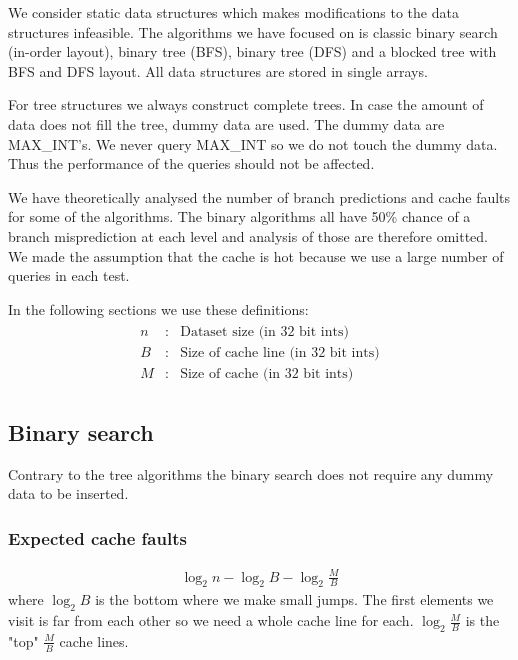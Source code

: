 We consider static data structures which makes modifications to the data structures infeasible.
The algorithms we have focused on is classic binary search (in-order layout), binary tree (BFS), binary tree (DFS) and a blocked tree with BFS and DFS layout. All data structures are stored in single arrays.

For tree structures we always construct complete trees. In case the amount of data does not fill the tree, dummy data are used. The dummy data are MAX\_INT's. We never query MAX\_INT so we do not touch the dummy data. Thus the performance of the queries should not be affected.

We have theoretically analysed the number of branch predictions and cache faults for some of the algorithms. The binary algorithms all have 50\% chance of a branch misprediction at each level and analysis of those are therefore omitted. We made the assumption that the cache is hot because we use a large number of queries in each test.

In the following sections we use these definitions:
\begin{eqnarray*}
\begin{array}{rcl}
n & : & \textrm{Dataset size (in 32 bit ints)} \\
B & : & \textrm{Size of cache line (in 32 bit ints)} \\
M & : & \textrm{Size of cache (in 32 bit ints)}
\end{array}
\end{eqnarray*}

\subsection{Binary search}

Contrary to the tree algorithms the binary search does not require any dummy data to be inserted.

\subsubsection*{Expected cache faults}


\begin{eqnarray*}
\log_2 n - \log_2 B - \log_2 \frac{M}{B} 
\end{eqnarray*}
where $\log_2 B$ is the bottom where we make small jumps. The first elements we visit is far from each other so we need a whole cache line for each. $\log_2 \frac{M}{B}$ is the "top" $\frac{M}{B}$ cache lines.

